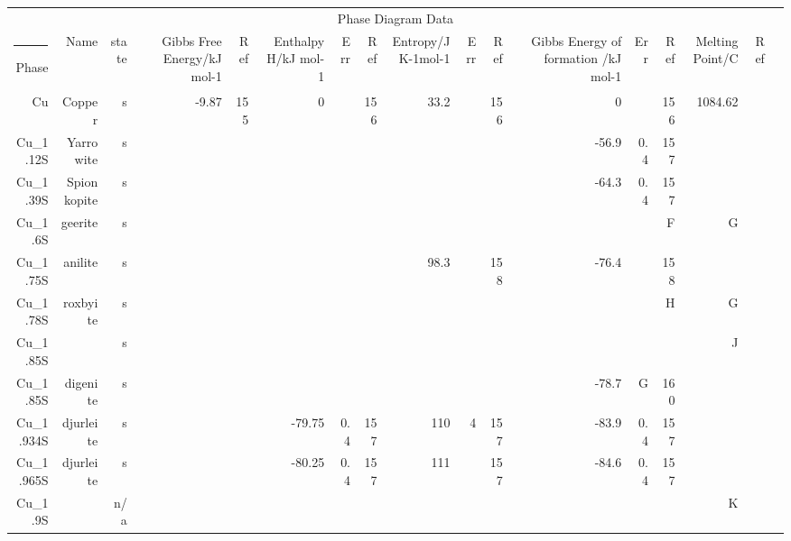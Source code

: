 \begin{table}[htbp]
  \centering
  \begin{adjustbox}{width=1\textwidth}
    \begin{tabular}{rrrrrrrrrrrrrrrrr}
    \toprule
    \multicolumn{17}{c}{Phase Diagram Data} \\
    \hrule
    Phase & Name  & state & Gibbs Free Energy/kJ mol-1 & Ref   & Enthalpy H/kJ mol-1 & Err   & Ref   & Entropy/J K-1mol-1 & Err   & Ref   & Gibbs Energy of formation /kJ mol-1 & Err   & Ref   & Melting Point/C & Ref   &  \\
    Cu    & Copper & s     & -9.87 & 155   & 0     &       & 156   & 33.2  &       & 156   & 0     &       & 156   & 1084.62 &       &  \\
    Cu\_1.12S & Yarrowite & s     &       &       &       &       &       &       &       &       & -56.9 & 0.4   & 157   &       &       &  \\
    Cu\_1.39S & Spionkopite & s     &       &       &       &       &       &       &       &       & -64.3 & 0.4   & 157   &       &       &  \\
    Cu\_1.6S & geerite & s     &       &       &       &       &       &       &       &       &       &       & F     & G     &       &  \\
    Cu\_1.75S & anilite & s     &       &       &       &       &       & 98.3  &       & 158   & -76.4 &       & 158   &       &       &  \\
    Cu\_1.78S & roxbyite & s     &       &       &       &       &       &       &       &       &       &       & H     & G     &       &  \\
    Cu\_1.85S &       & s     &       &       &       &       &       &       &       &       &       &       &       & J     &       &  \\
    Cu\_1.85S & digenite & s     &       &       &       &       &       &       &       &       & -78.7 & G     & 160   &       &       &  \\
    Cu\_1.934S & djurleite & s     &       &       & -79.75 & 0.4   & 157   & 110   & 4     & 157   & -83.9 & 0.4   & 157   &       &       &  \\
    Cu\_1.965S & djurleite & s     &       &       & -80.25 & 0.4   & 157   & 111   &       & 157   & -84.6 & 0.4   & 157   &       &       &  \\
    Cu\_1.9S &       & n/a   &       &       &       &       &       &       &       &       &       &       &       & K     &       &  \\

\end{tabular}
\end{adjustbox}
\end{table}
